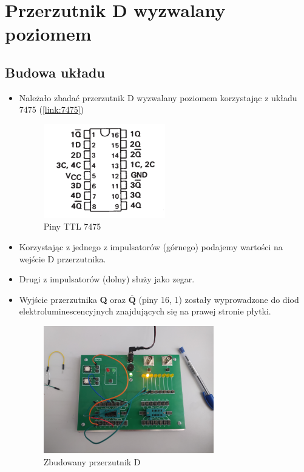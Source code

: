 \chapter{Przerzutnik D wyzwalany poziomem}

\section{Budowa układu}

\begin{itemize}
    \item Należało zbadać przerzutnik D wyzwalany poziomem korzystając z układu 7475 (\ref{link:7475})
        \begin{figure}[H]
            \centering
            \includegraphics[width=0.5\textwidth]{img/schemes/7475_pins.png}
            \caption{Piny TTL 7475}
            \label{D_poziom:piny}
        \end{figure}
    \item Korzystając z jednego z impulsatorów (górnego) podajemy wartości na wejście D przerzutnika.
    \item Drugi z impulsatorów (dolny) służy jako zegar.
    \item Wyjście przerzutnika \textbf{Q} oraz $\overline{\textbf{Q}}$ (piny 16, 1) zostały wyprowadzone do diod elektroluminescencyjnych znajdujących się na prawej stronie płytki.
        \begin{figure}[H]
            \centering
            \includegraphics[width=0.7\textwidth]{img/5_4/1653500525041_scaled.png}
            \caption{Zbudowany przerzutnik D}
            \label{D_poziom:zbudowany}
        \end{figure}
        

\end{itemize}

